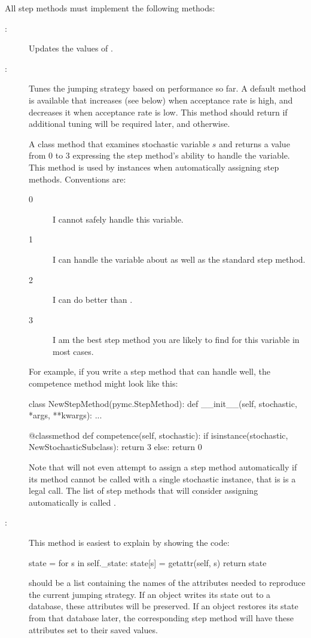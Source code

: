 \documentclass[]{jss}
\begin{document}
All step methods must implement the following methods:
\begin{description}
   \item[:] Updates the values of .
   \item[:] Tunes the jumping strategy based on performance so far. A default method is available that increases  (see below) when acceptance rate is high, and decreases it when acceptance rate is low. This method should return  if additional tuning will be required later, and  otherwise.
   \item[] A class method that examines stochastic variable $s$ and returns a value from 0 to 3 expressing the step method's ability to handle the variable. This method is used by  instances when automatically assigning step methods. Conventions are:
   \begin{description}
      \item[0] I cannot safely handle this variable.
      \item[1] I can handle the variable about as well as the standard  step method.
      \item[2] I can do better than .
      \item[3] I am the best step method you are likely to find for this variable in most cases.
   \end{description}
   For example, if you write a step method that can handle  well, the competence method might look like this:
\begin{CodeInput}
class NewStepMethod(pymc.StepMethod):
    def __init__(self, stochastic, *args, **kwargs):
      ...

    @classmethod
    def competence(self, stochastic):
      if isinstance(stochastic, NewStochasticSubclass):
         return 3
      else:
         return 0
\end{CodeInput}
   Note that  will not even attempt to assign a step method automatically if its  method cannot be called with a single stochastic instance, that is  is a legal call. The list of step methods that  will consider assigning automatically is called .
   \item[:] This method is easiest to explain by showing the code:
   \begin{CodeInput}
state = {}
for s in self._state:
	state[s] = getattr(self, s)
	return state
\end{CodeInput}
    should be a list containing the names of the attributes needed to reproduce the current jumping strategy. If an  object writes its state out to a database, these attributes will be preserved. If an  object restores its state from that database later, the corresponding step method will have these attributes set to their saved values.
\end{description}
\end{document}
